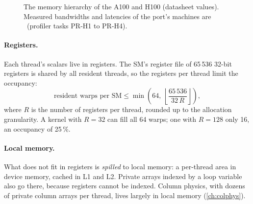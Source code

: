 \begin{figure}[ht]
\centering
{}
\caption{The memory hierarchy of the A100 and H100 (datasheet values). Measured bandwidths and latencies of the
port's machines are \tbr\ (profiler tasks PR-H1 to PR-H4).}
\label{fig:memhier}
\end{figure}

\paragraph{Registers.} Each thread's scalars live in registers. The SM's register file of 65\,536 32-bit registers
is shared by all resident threads, so the registers per thread limit the occupancy:
\begin{equation}
  \text{resident warps per SM} \le \min\left(64,\ \left\lfloor \frac{65\,536}{32\,R} \right\rfloor\right),
  \label{eq:occ-regs}
\end{equation}
where $R$ is the number of registers per thread, rounded up to the allocation granularity. A kernel with $R = 32$
can fill all 64 warps; one with $R = 128$ only 16, an occupancy of 25\,\%.

\paragraph{Local memory.} What does not fit in registers is \emph{spilled} to local memory: a per-thread area in
device memory, cached in L1 and L2. Private arrays indexed by a loop variable also go there, because registers
cannot be indexed. Column physics, with dozens of private column arrays per thread, lives largely in local memory
(\cref{ch:colphys}).

